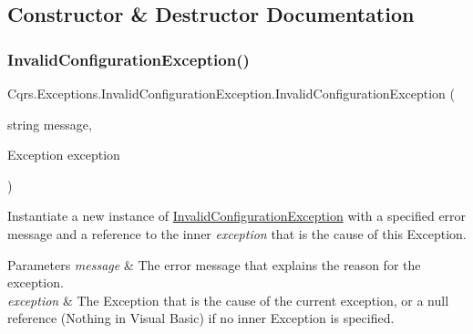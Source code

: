 \subsection{Constructor \& Destructor Documentation}
\mbox{\label{classCqrs_1_1Exceptions_1_1InvalidConfigurationException_af632b697236e7a5f3eec24746213dac1_af632b697236e7a5f3eec24746213dac1}} 
\subsubsection{\texorpdfstring{Invalid\+Configuration\+Exception()}{InvalidConfigurationException()}}
{\footnotesize\ttfamily Cqrs.\+Exceptions.\+Invalid\+Configuration\+Exception.\+Invalid\+Configuration\+Exception (\begin{DoxyParamCaption}\item[{string}]{message,  }\item[{Exception}]{exception }\end{DoxyParamCaption})}



Instantiate a new instance of \hyperlink{classCqrs_1_1Exceptions_1_1InvalidConfigurationException}{Invalid\+Configuration\+Exception} with a specified error message and a reference to the inner {\itshape exception}  that is the cause of this Exception. 


\begin{DoxyParams}{Parameters}
{\em message} & The error message that explains the reason for the exception.\\
\hline
{\em exception} & The Exception that is the cause of the current exception, or a null reference (Nothing in Visual Basic) if no inner Exception is specified.\\
\hline
\end{DoxyParams}
